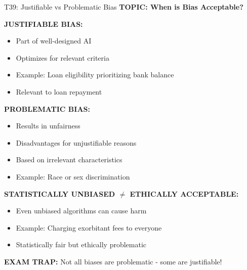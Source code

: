 \documentclass[8pt]{beamer}
\begin{document}
	\begin{frame}{T39: Justifiable vs Problematic Bias}
		\fontsize{6.5}{7.5}\selectfont
		\textbf{TOPIC: When is Bias Acceptable?}
		
		\vspace{0.1cm}
		\textbf{JUSTIFIABLE BIAS:}
		\begin{itemize}
			\item Part of well-designed AI
			\item Optimizes for relevant criteria
			\item Example: Loan eligibility prioritizing bank balance
			\item Relevant to loan repayment
		\end{itemize}
		
		\vspace{0.1cm}
		\textbf{PROBLEMATIC BIAS:}
		\begin{itemize}
			\item Results in unfairness
			\item Disadvantages for unjustifiable reasons
			\item Based on irrelevant characteristics
			\item Example: Race or sex discrimination
		\end{itemize}
		
		\vspace{0.1cm}
		\textbf{STATISTICALLY UNBIASED $\neq$ ETHICALLY ACCEPTABLE:}
		\begin{itemize}
			\item Even unbiased algorithms can cause harm
			\item Example: Charging exorbitant fees to everyone
			\item Statistically fair but ethically problematic
		\end{itemize}
		
		\textcolor{myred}{\textbf{EXAM TRAP:}} Not all biases are \textcolor{myblue}{problematic} - some are justifiable!
	\end{frame}
	
\end{document}
